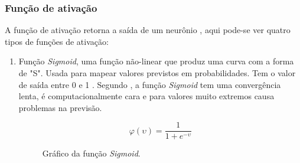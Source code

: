 \subsubsection*{Função de ativação}

A função de ativação retorna a saída de um neurônio \space\cite{haykin1999neural}, aqui pode-se ver quatro tipos de funções de ativação:

\begin{enumerate}
	\item Função \textit{Sigmoid}, uma função não-linear que produz uma curva com a forma de "S". Usada para mapear valores previstos em probabilidades. Tem o valor de saída entre 0 e 1 \space\cite{gharat2019what}. Segundo , a função \textit{Sigmoid} tem uma convergência lenta, é computacionalmente cara e para valores muito extremos causa problemas na previsão.
	\begin{figure}[ht]
	\caption{Gráfico da função \textit{Sigmoid}.}
	\begin{center}
		\begin{minipage}{0.45\textwidth}
			\begin{equation}
				\varphi(\upsilon) = \frac{1}{1 + e^{-\upsilon}}
			\end{equation}
		\end{minipage}
		\hfill
		\begin{minipage}{0.45\textwidth}
		\end{minipage}
	\end{center}
	\label{fig:grafico_sigmoid}
	\end{figure}


\end{enumerate}
